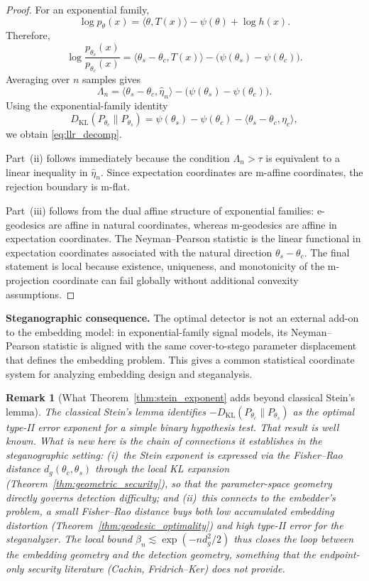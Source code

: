 \documentclass[a4paper,fleqn]{cas-dc}
\newtheorem{remark}{Remark}
\newcommand{\DKL}{D_{\mathrm{KL}}}
\begin{document}
\begin{proof}
For an exponential family,
\[
  \log p_\theta(x)
  =
  \langle\theta,T(x)\rangle-\psi(\theta)+\log h(x).
\]
Therefore,
\[
  \log\frac{p_{\theta_s}(x)}{p_{\theta_c}(x)}
  =
  \langle\theta_s-\theta_c,T(x)\rangle
  -
  \bigl(\psi(\theta_s)-\psi(\theta_c)\bigr).
\]
Averaging over $n$ samples gives
\[
  \Lambda_n
  =
  \langle\theta_s-\theta_c,\hat\eta_n\rangle
  -
  \bigl(\psi(\theta_s)-\psi(\theta_c)\bigr).
\]
Using the exponential-family identity
\[
  \DKL(P_{\theta_c}\|P_{\theta_s})
  =
  \psi(\theta_s)-\psi(\theta_c)
  -
  \langle\theta_s-\theta_c,\eta_c\rangle,
\]
we obtain \eqref{eq:llr_decomp}.

Part~(ii) follows immediately because the condition
$\Lambda_n>\tau$ is equivalent to a linear inequality in
$\hat\eta_n$.  Since expectation coordinates are m-affine coordinates,
the rejection boundary is m-flat.

Part~(iii) follows from the dual affine structure of exponential families:
e-geodesics are affine in natural coordinates, whereas m-geodesics are
affine in expectation coordinates.  The Neyman--Pearson statistic is the
linear functional in expectation coordinates associated with the natural
direction $\theta_s-\theta_c$.  The final statement is local because
existence, uniqueness, and monotonicity of the m-projection coordinate can
fail globally without additional convexity assumptions.
\end{proof}

\noindent\textbf{Steganographic consequence.}
The optimal detector is not an external add-on to the embedding model: in
exponential-family signal models, its Neyman--Pearson statistic is aligned with
the same cover-to-stego parameter displacement that defines the embedding
problem. This gives a common statistical coordinate system for analyzing
embedding design and steganalysis.

\begin{remark}[What Theorem~\ref{thm:stein_exponent} adds beyond classical Stein's lemma]
The classical Stein's lemma identifies $-D_{\mathrm{KL}}(P_{\theta_c}\|P_{\theta_s})$
as the optimal type-II error exponent for a simple binary hypothesis test.
That result is well known.
What is new here is the chain of connections it establishes in the
steganographic setting: (i)~the Stein exponent is expressed via the
Fisher--Rao distance $d_g(\theta_c,\theta_s)$ through the local KL expansion
(Theorem~\ref{thm:geometric_security}), so that the parameter-space geometry
directly governs detection difficulty; and (ii)~this connects to the embedder's
problem, a small Fisher--Rao distance buys both low accumulated embedding
distortion (Theorem~\ref{thm:geodesic_optimality}) and high type-II error for
the steganalyzer.
The local bound $\beta_n \lesssim \exp(-nd_g^2/2)$ thus closes the loop
between the embedding geometry and the detection geometry, something that the
endpoint-only security literature (Cachin, Fridrich--Ker) does not provide.
\end{remark}
\end{document}
